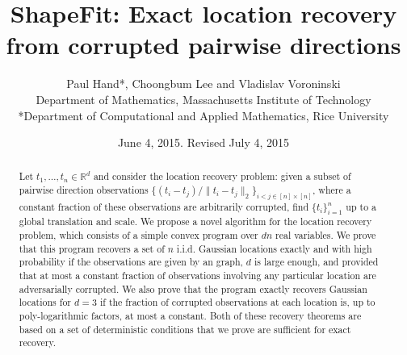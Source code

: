 \documentclass[11pt]{article}
\title{ShapeFit: Exact location recovery from  corrupted pairwise directions}
\author{ Paul Hand*, Choongbum Lee and Vladislav Voroninski\\
  Department of Mathematics, Massachusetts Institute of Technology\\
  *Department of Computational and Applied Mathematics, Rice University
}
\date{June 4, 2015.  Revised July 4, 2015}		%
\newcommand{\red}[1]{\textcolor{red}{#1}}
\begin{document}
\maketitle

\begin{abstract}
Let $t_1,\ldots,t_n \in \mathbb{R}^d$ and consider the location recovery problem: given a subset of pairwise direction observations $\{(t_i - t_j) / \|t_i - t_j\|_2\}_{i<j \in [n] \times [n]}$, where a constant fraction of these observations are arbitrarily corrupted, find $\{t_i\}_{i=1}^n$ up to a global translation and scale. We propose a novel algorithm for the location recovery problem, which consists of a simple convex program over $dn$ real variables. We prove that this program recovers a set of $n$ i.i.d. Gaussian locations exactly and with high probability if the observations are given by an \erdosrenyi graph, $d$ is large enough, and provided that at most a constant fraction of observations involving any particular location are adversarially corrupted.  We also prove that the program exactly recovers  Gaussian locations for $d=3$ if the fraction of corrupted observations at each location is, up to poly-logarithmic factors, at most a constant.  Both of these recovery theorems are based on a set of deterministic conditions that we prove are sufficient for exact recovery.




\end{abstract}
\end{document}
